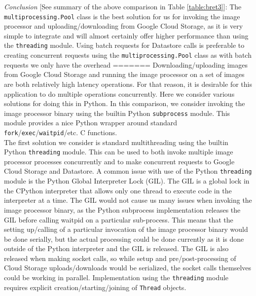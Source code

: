 \documentclass[10pt, onecolumn, draftclsnofoot, letterpaper, compsoc]{IEEEtran}
\begin{document}
\textit{Conclusion} [See summary of the above comparison in Table \ref{table:bret3}]:
The {\tt multiprocessing.Pool} class is the best solution for us
for invoking the image processor and uploading/downloading from Google Cloud
Storage, as it is very simple to integrate and will almost certainly offer
higher performance than using the {\tt threading} module. Using batch requests for
Datastore calls is preferable to creating concurrent requests using the
{\tt multiprocessing.Pool} class as with batch requests we only have the overhead
=======
Downloading/uploading images from Google Cloud Storage and running the
image processor on a set of images are both relatively high latency operations.
For that reason, it is desirable for this application to do multiple operations
concurrently. Here we consider various solutions for doing this in Python. In
this comparison, we consider invoking the image processor binary using the
builtin Python {\tt subprocess} module. This module provides a nice Python wrapper
around standard {\tt fork}/{\tt exec}/{\tt waitpid}/etc. C functions. \\

The first solution we consider is standard multithreading using the builtin
Python {\tt threading} module. This can be used to both invoke multiple image
processor processes concurrently and to make concurrent requests to Google
Cloud Storage and Datastore. A common issue with use of the Python {\tt threading}
module is the Python Global Interpreter Lock (GIL)\cite{gilArticle}. The GIL
is a global lock in the CPython interpreter that allows only one thread to
execute code in the interpreter at a time\cite{gilArticle}. The GIL would
not cause us many issues when invoking the image processor binary, as
the Python subprocess implementation releases the GIL before calling
waitpid on a particular sub-process. This means that the
setting up/calling of a particular invocation of the image processor binary
would be done serially, but the actual processing could be done currently as
it is done outside of the Python interpreter and the GIL is released\cite{gilArticle}.
The GIL is also released when making socket calls, so while setup and
pre/post-processing of Cloud Storage uploads/downloads would be
serialized, the socket calls themselves could be working in parallel\cite{gilArticle}.
Implementation using the {\tt threading} module requires explicit
creation/starting/joining of {\tt Thread} objects. \\
\end{document}
